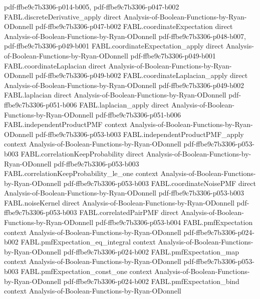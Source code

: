 \begin{theorem}
  {pdf-ffbe9c7b3306-p014-b005,
    pdf-ffbe9c7b3306-p047-b002}
\proofstep
  {FABL.discreteDerivative_apply}
  {direct}
  {Analysis-of-Boolean-Functions-by-Ryan-ODonnell}
  {pdf-ffbe9c7b3306-p047-b002}
\proofstep
  {FABL.coordinateExpectation}
  {direct}
  {Analysis-of-Boolean-Functions-by-Ryan-ODonnell}
  {pdf-ffbe9c7b3306-p048-b007,
    pdf-ffbe9c7b3306-p049-b001}
\proofstep
  {FABL.coordinateExpectation_apply}
  {direct}
  {Analysis-of-Boolean-Functions-by-Ryan-ODonnell}
  {pdf-ffbe9c7b3306-p049-b001}
\proofstep
  {FABL.coordinateLaplacian}
  {direct}
  {Analysis-of-Boolean-Functions-by-Ryan-ODonnell}
  {pdf-ffbe9c7b3306-p049-b002}
\proofstep
  {FABL.coordinateLaplacian_apply}
  {direct}
  {Analysis-of-Boolean-Functions-by-Ryan-ODonnell}
  {pdf-ffbe9c7b3306-p049-b002}
\proofstep
  {FABL.laplacian}
  {direct}
  {Analysis-of-Boolean-Functions-by-Ryan-ODonnell}
  {pdf-ffbe9c7b3306-p051-b006}
\proofstep
  {FABL.laplacian_apply}
  {direct}
  {Analysis-of-Boolean-Functions-by-Ryan-ODonnell}
  {pdf-ffbe9c7b3306-p051-b006}
\proofstep
  {FABL.independentProductPMF}
  {context}
  {Analysis-of-Boolean-Functions-by-Ryan-ODonnell}
  {pdf-ffbe9c7b3306-p053-b003}
\proofstep
  {FABL.independentProductPMF_apply}
  {context}
  {Analysis-of-Boolean-Functions-by-Ryan-ODonnell}
  {pdf-ffbe9c7b3306-p053-b003}
\proofstep
  {FABL.correlationKeepProbability}
  {direct}
  {Analysis-of-Boolean-Functions-by-Ryan-ODonnell}
  {pdf-ffbe9c7b3306-p053-b003}
\proofstep
  {FABL.correlationKeepProbability_le_one}
  {context}
  {Analysis-of-Boolean-Functions-by-Ryan-ODonnell}
  {pdf-ffbe9c7b3306-p053-b003}
\proofstep
  {FABL.coordinateNoisePMF}
  {direct}
  {Analysis-of-Boolean-Functions-by-Ryan-ODonnell}
  {pdf-ffbe9c7b3306-p053-b003}
\proofstep
  {FABL.noiseKernel}
  {direct}
  {Analysis-of-Boolean-Functions-by-Ryan-ODonnell}
  {pdf-ffbe9c7b3306-p053-b003}
\proofstep
  {FABL.correlatedPairPMF}
  {direct}
  {Analysis-of-Boolean-Functions-by-Ryan-ODonnell}
  {pdf-ffbe9c7b3306-p053-b004}
\proofstep
  {FABL.pmfExpectation}
  {context}
  {Analysis-of-Boolean-Functions-by-Ryan-ODonnell}
  {pdf-ffbe9c7b3306-p024-b002}
\proofstep
  {FABL.pmfExpectation_eq_integral}
  {context}
  {Analysis-of-Boolean-Functions-by-Ryan-ODonnell}
  {pdf-ffbe9c7b3306-p024-b002}
\proofstep
  {FABL.pmfExpectation_map}
  {context}
  {Analysis-of-Boolean-Functions-by-Ryan-ODonnell}
  {pdf-ffbe9c7b3306-p053-b003}
\proofstep
  {FABL.pmfExpectation_const_one}
  {context}
  {Analysis-of-Boolean-Functions-by-Ryan-ODonnell}
  {pdf-ffbe9c7b3306-p024-b002}
\proofstep
  {FABL.pmfExpectation_bind}
  {context}
  {Analysis-of-Boolean-Functions-by-Ryan-ODonnell}

\end{theorem}
